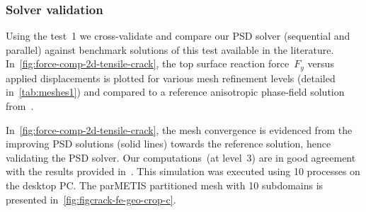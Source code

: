 \documentclass{report}
\begin{document}
\subsubsection{Solver validation \label{sec:solver-validation}}
Using the test~1 we cross-validate and compare our PSD solver (sequential and parallel) against benchmark solutions of this test available in the literature. 
In~\cref{fig:force-comp-2d-tensile-crack}, the top surface reaction force~$F_y$ versus applied displacements is plotted for various mesh refinement levels (detailed in~\cref{tab:meshes1}) and compared to a reference anisotropic phase-field solution from~\cite{amor2009regularized}.

In~\cref{fig:force-comp-2d-tensile-crack}, the mesh convergence is evidenced from the improving PSD solutions (solid lines) towards the reference solution, hence validating  the PSD solver. 
Our computations~(at level~3) are in good agreement with the results provided in~\cite{amor2009regularized}. This simulation was executed using 10 processes on the desktop PC. The parMETIS partitioned mesh with 10 subdomains is presented in~\cref{fig:figcrack-fe-geo-crop-c}.    
\end{document}
